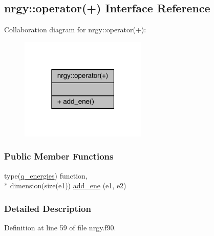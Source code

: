 \hypertarget{interfacenrgy_1_1operator_07_09_08}{\subsection{nrgy\-:\-:operator(+) Interface Reference}
\label{interfacenrgy_1_1operator_07_09_08}
}


Collaboration diagram for nrgy\-:\-:operator(+)\-:
\nopagebreak
\begin{figure}[H]
\begin{center}
\leavevmode
\includegraphics[width=171pt]{interfacenrgy_1_1operator_07_09_08__coll__graph}
\end{center}
\end{figure}
\subsubsection*{Public Member Functions}
\begin{DoxyCompactItemize}
\item 
type(\hyperlink{structnrgy_1_1q__energies}{q\-\_\-energies}) function, \\*
dimension(size(e1)) \hyperlink{interfacenrgy_1_1operator_07_09_08_a7625cc7ed19db8f1d875807a3fb30f5d}{add\-\_\-ene} (e1, e2)
\end{DoxyCompactItemize}


\subsubsection{Detailed Description}


Definition at line 59 of file nrgy.\-f90.



